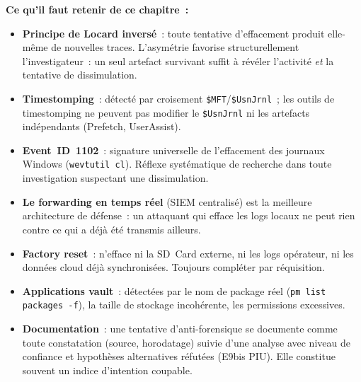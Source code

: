\separateur

\begin{boxresume}
\textbf{Ce qu'il faut retenir de ce chapitre~:}
\begin{itemize}
    \item \textbf{Principe de Locard inversé}~: toute tentative
          d'effacement produit elle-même de nouvelles traces.
          L'asymétrie favorise structurellement l'investigateur~:
          un seul artefact survivant suffit à révéler l'activité
          \emph{et} la tentative de dissimulation.

    \item \textbf{Timestomping}~: détecté par croisement
          \texttt{\$MFT}/\texttt{\$UsnJrnl}~; les outils de
          timestomping ne peuvent pas modifier le \texttt{\$UsnJrnl}
          ni les artefacts indépendants (Prefetch, UserAssist).

    \item \textbf{Event~ID~1102}~: signature universelle de
          l'effacement des journaux Windows (\texttt{wevtutil cl}).
          Réflexe systématique de recherche dans toute investigation
          suspectant une dissimulation.

    \item \textbf{Le forwarding en temps réel} (SIEM centralisé)
          est la meilleure architecture de défense~: un attaquant
          qui efface les logs locaux ne peut rien contre ce qui a
          déjà été transmis ailleurs.

    \item \textbf{Factory reset}~: n'efface ni la SD~Card externe,
          ni les logs opérateur, ni les données cloud déjà
          synchronisées. Toujours compléter par réquisition.

    \item \textbf{Applications vault}~: détectées par le nom de
          package réel (\texttt{pm list packages -f}), la taille
          de stockage incohérente, les permissions excessives.

    \item \textbf{Documentation}~: une tentative d'anti-forensique
          se documente comme toute constatation (source, horodatage)
          suivie d'une analyse avec niveau de confiance et
          hypothèses alternatives réfutées (E9bis PIU). Elle
          constitue souvent un indice d'intention coupable.
\end{itemize}
\end{boxresume}

